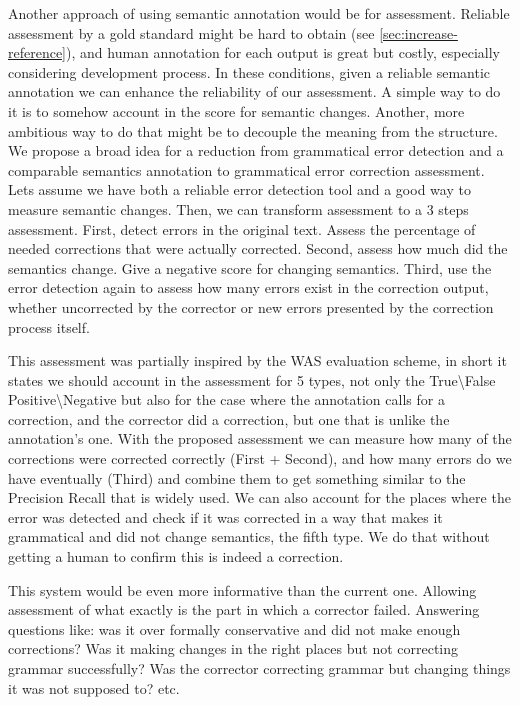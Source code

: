 \documentclass[english]{article}
\begin{document}
Another approach of using semantic annotation would be for assessment.
Reliable assessment by a gold standard might be hard to obtain (see
\ref{sec:increase-reference}), and human annotation for each output is great\cite{madnani2011they}
but costly, especially considering development process. In these conditions,
given a reliable semantic annotation we can enhance the reliability
of our assessment. A simple way to do it is to somehow account in the score for semantic changes. Another, more ambitious way to do that might be to decouple the meaning
from the structure. We propose a broad idea for a reduction from grammatical
error detection and a comparable semantics annotation to grammatical
error correction assessment. Lets assume we have both a reliable error
detection tool and a good way to measure semantic changes. Then, we
can transform assessment to a 3 steps assessment. First, detect errors
in the original text. Assess the percentage of needed corrections
that were actually corrected. Second, assess how much did the semantics change.
 Give a negative score for changing semantics. Third, use
the error detection again to assess how many errors exist in the correction
output, whether uncorrected by the corrector or new errors presented
by the correction process itself. 

This assessment was partially inspired by the WAS evaluation scheme\cite{chodorow2012problems},
in short it states we should account in the assessment for 5 types,
not only the True\textbackslash{}False Positive\textbackslash{}Negative
but also for the case where the annotation calls for a correction,
and the corrector did a correction, but one that is unlike the annotation's
one. With the proposed assessment we can measure how many of the corrections
were corrected correctly (First + Second), and how many errors do
we have eventually (Third) and combine them to get something similar
to the Precision Recall that is widely used. We can also account for
the places where the error was detected and check if it was corrected
in a way that makes it grammatical and did not change semantics, the
fifth type. We do that without getting a human to confirm this is
indeed a correction.

This system would be even more informative than the current one. Allowing assessment of
what exactly is the part in which a corrector failed. Answering questions
like: was it over formally conservative and did not make enough corrections?
Was it making changes in the right places but not correcting grammar
successfully? Was the corrector correcting grammar but changing things
it was not supposed to? etc.
\end{document}
